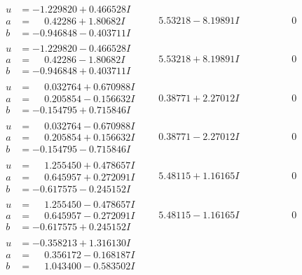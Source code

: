 \documentclass[1p]{elsarticle_modified}
\theoremstyle{definition}
\begin{document}
$$\begin{array}{c|c|c}
\begin{aligned}
u &= -1.229820 + 0.466528 I \\
a &= \phantom{-}0.42286 + 1.80682 I \\
b &= -0.946848 - 0.403711 I\end{aligned}
 & \phantom{-}5.53218 - 8.19891 I & \phantom{-0.000000 } 0 \\ \hline\begin{aligned}
u &= -1.229820 - 0.466528 I \\
a &= \phantom{-}0.42286 - 1.80682 I \\
b &= -0.946848 + 0.403711 I\end{aligned}
 & \phantom{-}5.53218 + 8.19891 I & \phantom{-0.000000 } 0 \\ \hline\begin{aligned}
u &= \phantom{-}0.032764 + 0.670988 I \\
a &= \phantom{-}0.205854 - 0.156632 I \\
b &= -0.154795 + 0.715846 I\end{aligned}
 & \phantom{-}0.38771 + 2.27012 I & \phantom{-0.000000 } 0 \\ \hline\begin{aligned}
u &= \phantom{-}0.032764 - 0.670988 I \\
a &= \phantom{-}0.205854 + 0.156632 I \\
b &= -0.154795 - 0.715846 I\end{aligned}
 & \phantom{-}0.38771 - 2.27012 I & \phantom{-0.000000 } 0 \\ \hline\begin{aligned}
u &= \phantom{-}1.255450 + 0.478657 I \\
a &= \phantom{-}0.645957 + 0.272091 I \\
b &= -0.617575 - 0.245152 I\end{aligned}
 & \phantom{-}5.48115 + 1.16165 I & \phantom{-0.000000 } 0 \\ \hline\begin{aligned}
u &= \phantom{-}1.255450 - 0.478657 I \\
a &= \phantom{-}0.645957 - 0.272091 I \\
b &= -0.617575 + 0.245152 I\end{aligned}
 & \phantom{-}5.48115 - 1.16165 I & \phantom{-0.000000 } 0 \\ \hline\begin{aligned}
u &= -0.358213 + 1.316130 I \\
a &= \phantom{-}0.356172 - 0.168187 I \\
b &= \phantom{-}1.043400 - 0.583502 I\end{aligned}

\end{array}$$
\end{document}
